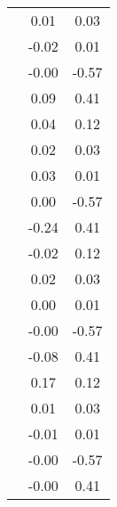 \begin{table}
\begin{tabular}{c|cc|}
\multicolumn{1}{|c|}{} & \multicolumn{1}{|c|}{      0.01} & \multicolumn{1}{|c|}{      0.03} \\ 
\multicolumn{1}{|c|}{} & \multicolumn{1}{|c|}{     -0.02} & \multicolumn{1}{|c|}{      0.01} \\ 
\multicolumn{1}{|c|}{} & \multicolumn{1}{|c|}{     -0.00} & \multicolumn{1}{|c|}{     -0.57} \\ 
\multicolumn{1}{|c|}{} & \multicolumn{1}{|c|}{      0.09} & \multicolumn{1}{|c|}{      0.41} \\ 
\multicolumn{1}{|c|}{} & \multicolumn{1}{|c|}{      0.04} & \multicolumn{1}{|c|}{      0.12} \\ 
\multicolumn{1}{|c|}{} & \multicolumn{1}{|c|}{      0.02} & \multicolumn{1}{|c|}{      0.03} \\ 
\multicolumn{1}{|c|}{} & \multicolumn{1}{|c|}{      0.03} & \multicolumn{1}{|c|}{      0.01} \\ 
\multicolumn{1}{|c|}{} & \multicolumn{1}{|c|}{      0.00} & \multicolumn{1}{|c|}{     -0.57} \\ 
\multicolumn{1}{|c|}{} & \multicolumn{1}{|c|}{     -0.24} & \multicolumn{1}{|c|}{      0.41} \\ 
\multicolumn{1}{|c|}{} & \multicolumn{1}{|c|}{     -0.02} & \multicolumn{1}{|c|}{      0.12} \\ 
\multicolumn{1}{|c|}{} & \multicolumn{1}{|c|}{      0.02} & \multicolumn{1}{|c|}{      0.03} \\ 
\multicolumn{1}{|c|}{} & \multicolumn{1}{|c|}{      0.00} & \multicolumn{1}{|c|}{      0.01} \\ 
\multicolumn{1}{|c|}{} & \multicolumn{1}{|c|}{     -0.00} & \multicolumn{1}{|c|}{     -0.57} \\ 
\multicolumn{1}{|c|}{} & \multicolumn{1}{|c|}{     -0.08} & \multicolumn{1}{|c|}{      0.41} \\ 
\multicolumn{1}{|c|}{} & \multicolumn{1}{|c|}{      0.17} & \multicolumn{1}{|c|}{      0.12} \\ 
\multicolumn{1}{|c|}{} & \multicolumn{1}{|c|}{      0.01} & \multicolumn{1}{|c|}{      0.03} \\ 
\multicolumn{1}{|c|}{} & \multicolumn{1}{|c|}{     -0.01} & \multicolumn{1}{|c|}{      0.01} \\ 
\multicolumn{1}{|c|}{} & \multicolumn{1}{|c|}{     -0.00} & \multicolumn{1}{|c|}{     -0.57} \\ 
\multicolumn{1}{|c|}{} & \multicolumn{1}{|c|}{     -0.00} & \multicolumn{1}{|c|}{      0.41} \\ 

\end{tabular}
\end{table}
